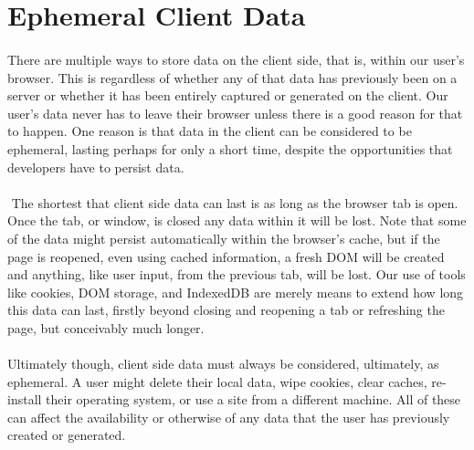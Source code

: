\section{Ephemeral Client Data}

\paragraph{} There are multiple ways to store data on the client side, that is, within our user's browser. This is regardless of whether any of that data has previously been on a server or whether it has been entirely captured or generated on the client. Our user’s data never has to leave their browser unless there is a good reason for that to happen. One reason is that data in the client can be considered to be ephemeral, lasting perhaps for only a short time, despite the opportunities that developers have to persist data.
\paragraph{} The shortest that client side data can last is as long as the browser tab is open. Once the tab, or window, is closed any data within it will be lost. Note that some of the data might persist automatically within the browser's cache, but if the page is reopened, even using cached information, a fresh DOM will be created and anything, like user input, from the previous tab, will be lost. Our use of tools like cookies, DOM storage, and IndexedDB are merely means to extend how long this data can last, firstly beyond closing and reopening a tab or refreshing the page, but conceivably much longer.
\paragraph{} Ultimately though, client side data must always be considered, ultimately, as ephemeral. A user might delete their local data, wipe cookies, clear caches, re-install their operating system, or use a site from a different machine. All of these can affect the availability or otherwise of any data that the user has previously created or generated.
